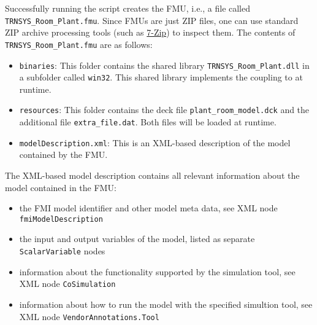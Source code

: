 Successfully running the script creates the FMU, i.e., a file called \verb!TRNSYS_Room_Plant.fmu!.
Since FMUs are just ZIP files, one can use standard ZIP archive processing tools (such as \href{http://www.7-zip.org/}{7-Zip}) to inspect them.
The contents of \verb!TRNSYS_Room_Plant.fmu! are as follows:
\begin{itemize}
  \item \verb!binaries!: This folder contains the shared library \verb!TRNSYS_Room_Plant.dll! in a subfolder called \verb!win32!.
  This shared library implements the coupling to \trnsys at runtime.

  \item \verb!resources!: This folder contains the deck file \verb!plant_room_model.dck! and the additional file \verb!extra_file.dat!. Both files will be loaded at runtime.

  \item \verb!modelDescription.xml!: This is an XML-based description of the model contained by the FMU.

\end{itemize}

The XML-based model description contains all relevant information about the model contained in the FMU:
\begin{itemize}
  \item the FMI model identifier and other model meta data, see XML node \texttt{fmiModelDescription}

  \item the input and output variables of the model, listed as separate \texttt{ScalarVariable} nodes

  \item information about the functionality supported by the simulation tool, see XML node \verb!CoSimulation!
  
  \item information about how to run the model with the specified simultion tool, see XML node \verb!VendorAnnotations.Tool!
\end{itemize}

